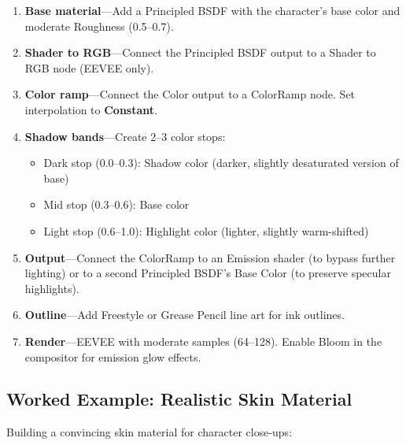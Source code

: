 \begin{enumerate}[leftmargin=2em]
  \item \textbf{Base material}---Add a Principled BSDF with the
        character's base color and moderate Roughness (0.5--0.7).
  \item \textbf{Shader to RGB}---Connect the Principled BSDF output
        to a Shader to RGB node (EEVEE only).
  \item \textbf{Color ramp}---Connect the Color output to a
        ColorRamp node. Set interpolation to \textbf{Constant}.
  \item \textbf{Shadow bands}---Create 2--3 color stops:
    \begin{itemize}[leftmargin=1.5em]
      \item Dark stop (0.0--0.3): Shadow color (darker, slightly
            desaturated version of base)
      \item Mid stop (0.3--0.6): Base color
      \item Light stop (0.6--1.0): Highlight color (lighter, slightly
            warm-shifted)
    \end{itemize}
  \item \textbf{Output}---Connect the ColorRamp to an Emission
        shader (to bypass further lighting) or to a second
        Principled BSDF's Base Color (to preserve specular
        highlights).
  \item \textbf{Outline}---Add Freestyle or Grease Pencil line art
        for ink outlines.
  \item \textbf{Render}---EEVEE with moderate samples (64--128).
        Enable Bloom in the compositor for emission glow effects.
\end{enumerate}

\subsection{Worked Example: Realistic Skin Material}

Building a convincing skin material for character close-ups:

